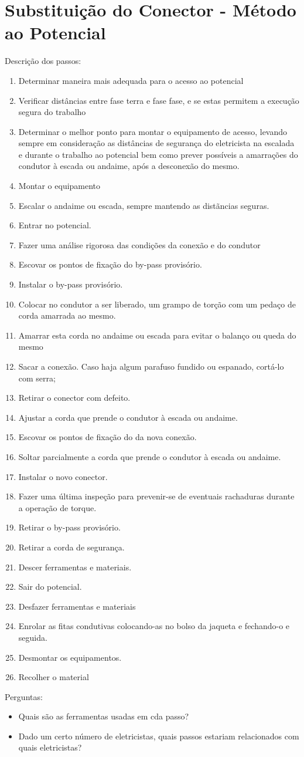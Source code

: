 \section{Substituição do Conector - Método ao Potencial}

Descrição dos passos:

\begin{enumerate}
	\item Determinar maneira mais adequada para o acesso ao potencial
	\item Verificar distâncias entre fase terra e fase fase, e se estas permitem a execução segura do trabalho
	\item Determinar o melhor ponto para montar o equipamento de acesso, levando sempre em consideração as distâncias de segurança do eletricista na escalada e durante o trabalho ao potencial bem como prever possíveis a amarrações do condutor à escada ou andaime, após a desconexão do mesmo.
	\item Montar o equipamento
	\item Escalar o andaime ou escada, sempre mantendo as distãncias seguras.
	\item Entrar no potencial.
	\item Fazer uma análise rigorosa das condições da conexão e do condutor
	\item Escovar os pontos de fixação do by-pass provisório.
	\item Instalar o by-pass provisório.
	\item Colocar no condutor a ser liberado, um grampo de torção com um pedaço de corda amarrada ao mesmo.
	\item Amarrar esta corda no andaime ou escada para evitar o balanço ou queda do mesmo
	\item Sacar a conexão. Caso haja algum parafuso fundido ou espanado, cortá-lo com serra;
	\item Retirar o conector com defeito.
	\item Ajustar a corda que prende o condutor à escada ou andaime.
	\item Escovar os pontos de fixação do da nova conexão.
	\item Soltar parcialmente a corda que prende o condutor à escada ou andaime.
	\item Instalar o novo conector.
	\item Fazer uma última inspeção para prevenir-se de eventuais rachaduras durante a operação de torque.
	\item Retirar o by-pass provisório.
	\item Retirar a corda de segurança.
	\item Descer ferramentas e materiais.
	\item Sair do potencial.
	\item Desfazer ferramentas e materiais
	\item Enrolar as fitas condutivas colocando-as no bolso da jaqueta e fechando-o e seguida.
	\item Desmontar os equipamentos.
	\item Recolher o material
\end{enumerate}

Perguntas: 
\begin{itemize}
    \item Quais são as ferramentas usadas em cda passo?
    \item Dado um certo número de eletricistas, quais passos estariam relacionados com quais eletricistas?
\end{itemize}